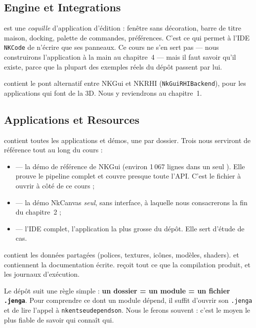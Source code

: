\subsection{Engine et Integrations}

 est une \emph{coquille} d'application d'édition :
fenêtre sans décoration, barre de titre maison, docking, palette de commandes,
préférences. C'est ce qui permet à l'IDE \texttt{NKCode} de n'écrire que ses
panneaux. Ce cours ne s'en sert pas — nous construirons l'application à la main
au chapitre~4 — mais il faut savoir qu'il existe, parce que la plupart des
exemples réels du dépôt passent par lui.

 contient le pont alternatif entre NKGui et NKRHI
(\texttt{NkGuiRHIBackend}), pour les applications qui font de la 3D. Nous y
reviendrons au chapitre~1.

\subsection{Applications et Resources}

 contient toutes les applications et démos, une par
dossier. Trois nous serviront de référence tout au long du cours :

\begin{itemize}
  \item {} — la démo de référence de NKGui
        (environ 1\,067 lignes dans un seul ). Elle prouve le
        pipeline complet et couvre presque toute l'API. C'est le fichier à ouvrir
        à côté de ce cours ;
  \item {}
        — la démo NkCanvas \emph{seul}, sans interface, à laquelle nous
        consacrerons la fin du chapitre~2 ;
  \item {} — l'IDE complet, l'application la plus
        grosse du dépôt. Elle sert d'étude de cas.
\end{itemize}

 contient les données partagées (polices, textures, icônes,
modèles, shaders).  et  contiennent la
documentation écrite.  reçoit tout ce que la compilation produit,
et  les journaux d'exécution.

\begin{nkretenir}
Le dépôt suit une règle simple : \textbf{un dossier = un module = un fichier
\texttt{.jenga}}. Pour comprendre ce dont un module dépend, il suffit d'ouvrir
son \texttt{.jenga} et de lire l'appel à \texttt{nkentseudependson}. Nous le
ferons souvent : c'est le moyen le plus fiable de savoir qui connaît qui.
\end{nkretenir}


